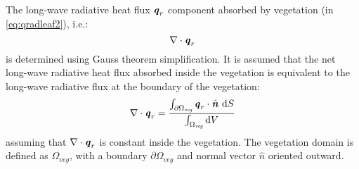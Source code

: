 The long-wave radiative heat flux $\textbf{\textit{q}}_r$ component absorbed by vegetation (in \cref{eq:qradleaf2}), i.e.:
\begin{equation}
\nabla \cdot \textbf{\textit{q}}_r 
\end{equation}
is determined using Gauss theorem simplification. It is assumed that the net long-wave radiative heat flux absorbed inside the vegetation is equivalent to the long-wave radiative flux at the boundary of the vegetation: 
\begin{equation}
\nabla \cdot \textbf{\textit{q}}_r = \frac{\int_{\partial \Omega_{\textit{veg}}} \textbf{\textit{q}}_r \cdot \hat{\textbf{\textit{n}}}~\mathrm{d}S}{\int_{\Omega_{\textit{veg}}}\mathrm{d}V}
\label{eq:qrlw12}
\end{equation}
assuming that $\nabla \cdot \textbf{\textit{q}}_r$ is constant inside the vegetation. The vegetation domain is defined as $\Omega_{\textit{veg}}$, with a boundary $\partial \Omega_{\textit{veg}}$ and normal vector $\hat{n}$ oriented outward. 

%
%
%

